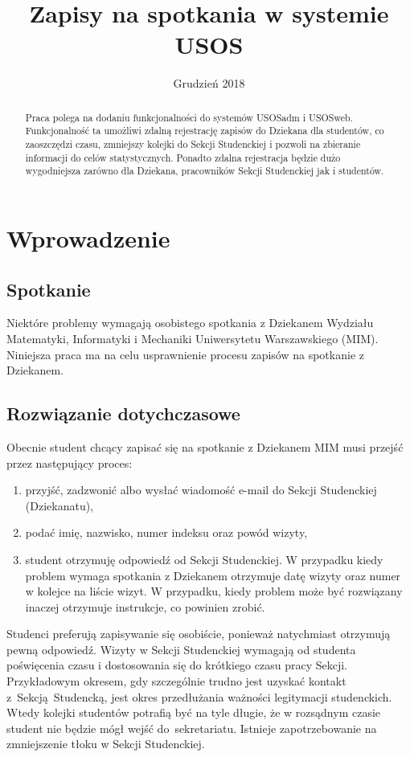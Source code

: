 \documentclass[licencjacka]{pracamgr}
\title{Zapisy na spotkania w systemie USOS}
\date{Grudzień 2018}
\begin{document}
\maketitle

\begin{abstract}
  Praca polega na dodaniu funkcjonalności do systemów USOSadm i USOSweb.
  Funkcjonalność ta umożliwi zdalną rejestrację zapisów do Dziekana dla studentów, co zaoszczędzi czasu, zmniejszy kolejki do Sekcji Studenckiej i pozwoli na zbieranie informacji do celów statystycznych.
  Ponadto zdalna rejestracja będzie dużo wygodniejsza zarówno dla Dziekana, pracowników Sekcji Studenckiej jak i studentów.
\end{abstract}

\tableofcontents

\chapter{Wprowadzenie} \label{chap:wpr}
\section{Spotkanie}
Niektóre problemy wymagają osobistego spotkania z Dziekanem Wydziału Matematyki, Informatyki i Mechaniki Uniwersytetu Warszawskiego (MIM). Niniejsza praca ma na celu usprawnienie procesu zapisów na spotkanie z Dziekanem.
\section{Rozwiązanie dotychczasowe}
Obecnie student chcący zapisać się na spotkanie z Dziekanem MIM musi przejść przez następujący proces:
\begin{enumerate}
\item przyjść, zadzwonić albo wysłać wiadomość e-mail do Sekcji Studenckiej (Dziekanatu),
\item podać imię, nazwisko, numer indeksu oraz powód wizyty,
\item student otrzymuję odpowiedź od Sekcji Studenckiej. W przypadku kiedy problem wymaga spotkania z Dziekanem otrzymuje datę wizyty oraz numer w kolejce na liście wizyt. W przypadku, kiedy problem może być rozwiązany inaczej otrzymuje instrukcje, co powinien zrobić.
\end{enumerate}
Studenci preferują zapisywanie się osobiście, ponieważ natychmiast otrzymują pewną odpowiedź. Wizyty w Sekcji Studenckiej wymagają od studenta poświęcenia czasu i dostosowania się do krótkiego czasu pracy Sekcji. Przykładowym okresem, gdy szczególnie trudno jest uzyskać kontakt z~Sekcją~Studencką, jest okres przedłużania ważności legitymacji studenckich. Wtedy kolejki studentów potrafią być na tyle długie, że w rozsądnym czasie student nie będzie mógł wejść do~sekretariatu. Istnieje zapotrzebowanie na zmniejszenie tłoku w Sekcji Studenckiej.
\end{document}
